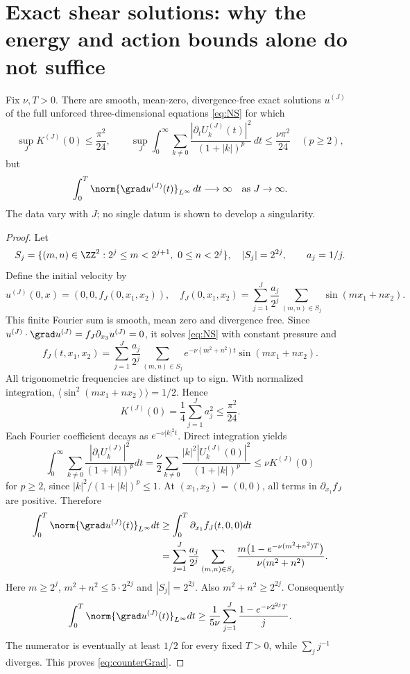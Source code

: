 \section{Exact shear solutions: why the energy and action bounds alone do not suffice}
\begin{theorem}\label{thm:counter}
Fix $\nu,T>0$. There are smooth, mean-zero, divergence-free exact solutions $u^{(J)}$ of the full unforced three-dimensional equations \eqref{eq:NS} for which
\begin{equation}\label{eq:counterE}
\sup_J K^{(J)}(0)\le\frac{\pi^2}{24},\qquad
\sup_J\int_0^\infty\sum_{k\ne0}\frac{|\partial_tU_k^{(J)}(t)|^2}{(1+|k|)^p}\,dt\le\frac{\nu\pi^2}{24}\quad(p\ge2),
\end{equation}
but
\begin{equation}\label{eq:counterGrad}
\int_0^T\norm{\grad u^{(J)}(t)}_{L^\infty}\,dt\longrightarrow\infty\quad\text{as }J\to\infty.
\end{equation}
The data vary with $J$; no single datum is shown to develop a singularity.
\end{theorem}
\begin{proof}
Let
\[
S_j=\{(m,n)\in\ZZ^2:2^j\le m<2^{j+1},\ 0\le n<2^j\},\quad
|S_j|=2^{2j},\qquad a_j=1/j.
\]
Define the initial velocity by
\[
 u^{(J)}(0,x)=(0,0,f_J(0,x_1,x_2)),\quad
 f_J(0,x_1,x_2)=\sum_{j=1}^J\frac{a_j}{2^j}
\sum_{(m,n)\in S_j}\sin(mx_1+nx_2).
\]
This finite Fourier sum is smooth, mean zero and divergence free. Since
$u^{(J)}\cdot\grad u^{(J)}=f_J\partial_{x_3}u^{(J)}=0$, it solves \eqref{eq:NS} with constant pressure and
\[
f_J(t,x_1,x_2)=\sum_{j=1}^J\frac{a_j}{2^j}
\sum_{(m,n)\in S_j}e^{-\nu(m^2+n^2)t}\sin(mx_1+nx_2).
\]
All trigonometric frequencies are distinct up to sign. With normalized integration,
$\langle\sin^2(mx_1+nx_2)\rangle=1/2$. Hence
\[
K^{(J)}(0)=\frac14\sum_{j=1}^Ja_j^2\le\frac{\pi^2}{24}.
\]
Each Fourier coefficient decays as $e^{-\nu|k|^2t}$. Direct integration yields
\[
\int_0^\infty\sum_{k\ne0}
\frac{|\partial_tU_k^{(J)}|^2}{(1+|k|)^p}dt
=\frac\nu2\sum_{k\ne0}\frac{|k|^2|U_k^{(J)}(0)|^2}{(1+|k|)^p}
\le\nu K^{(J)}(0)
\]
for $p\ge2$, since $|k|^2/(1+|k|)^p\le1$.
At $(x_1,x_2)=(0,0)$, all terms in $\partial_{x_1}f_J$ are positive. Therefore
\begin{align*}
\int_0^T\norm{\grad u^{(J)}(t)}_{L^\infty}dt
&\ge\int_0^T\partial_{x_1}f_J(t,0,0)dt\\
&=\sum_{j=1}^J\frac{a_j}{2^j}
\sum_{(m,n)\in S_j}\frac{m\big(1-e^{-\nu(m^2+n^2)T}\big)}{\nu(m^2+n^2)}.
\end{align*}
Here $m\ge2^j$, $m^2+n^2\le5\cdot2^{2j}$ and $|S_j|=2^{2j}$. Also $m^2+n^2\ge2^{2j}$. Consequently
\[
\int_0^T\norm{\grad u^{(J)}(t)}_{L^\infty}dt
\ge\frac1{5\nu}\sum_{j=1}^J\frac{1-e^{-\nu 2^{2j}T}}{j}.
\]
The numerator is eventually at least $1/2$ for every fixed $T>0$, while $\sum_jj^{-1}$ diverges. This proves \eqref{eq:counterGrad}.
\end{proof}
